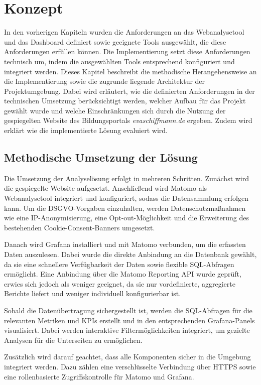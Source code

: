 \chapter{Konzept} %
\label{ch:konzept}
In den vorherigen Kapiteln wurden die Anforderungen an das Webanalysetool und das Dashboard definiert sowie geeignete Tools ausgewählt, die diese Anforderungen erfüllen können. Die Implementierung setzt diese Anforderungen technisch um, indem die ausgewählten Tools entsprechend konfiguriert und integriert werden. Dieses Kapitel beschreibt die methodische Herangehensweise an die Implementierung sowie die zugrunde liegende Architektur der Projektumgebung. Dabei wird erläutert, wie die definierten Anforderungen in der technischen Umsetzung berücksichtigt werden, welcher Aufbau für das Projekt gewählt wurde und welche Einschränkungen sich durch die Nutzung der gespiegelten Website des Bildungsportals \textit{evaschiffmann.de} ergeben. Zudem wird erklärt wie die implementierte Lösung evaluiert wird.

\section{Methodische Umsetzung der Lösung}
\label{sec:umsetzungloesung}
Die Umsetzung der Analyselösung erfolgt in mehreren Schritten. Zunächst wird die gespiegelte Website aufgesetzt. Anschließend wird Matomo als Webanalysetool integriert und konfiguriert, sodass die Datensammlung erfolgen kann. Um die DSGVO-Vorgaben einzuhalten, werden Datenschutzmaßnahmen wie eine IP-Anonymisierung, eine Opt-out-Möglichkeit und die Erweiterung des bestehenden Cookie-Consent-Banners umgesetzt.

Danach wird Grafana installiert und mit Matomo verbunden, um die erfassten Daten auszulesen. Dabei wurde die direkte Anbindung an die Datenbank gewählt, da sie eine schnellere Verfügbarkeit der Daten sowie flexible SQL-Abfragen ermöglicht. Eine Anbindung über die Matomo Reporting API wurde geprüft, erwies sich jedoch als weniger geeignet, da sie nur vordefinierte, aggregierte Berichte liefert und weniger individuell konfigurierbar ist.

Sobald die Datenübertragung sichergestellt ist, werden die SQL-Abfragen für die relevanten Metriken und KPIs erstellt und in den entsprechenden Grafana-Panels visualisiert. Dabei werden interaktive Filtermöglichkeiten integriert, um gezielte Analysen für die Unterseiten zu ermöglichen.

Zusätzlich wird darauf geachtet, dass alle Komponenten sicher in die Umgebung integriert werden. Dazu zählen eine verschlüsselte Verbindung über HTTPS sowie eine rollenbasierte Zugriffskontrolle für Matomo und Grafana.

